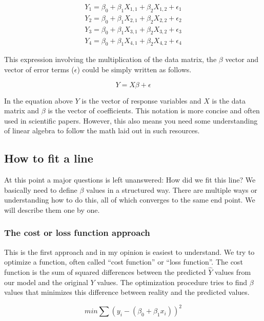 \documentclass[12pt,]{krantz}
\begin{document}
\[
\begin{aligned}
Y_1= \beta_0+\beta_1X_{1,1}+\beta_2X_{1,2} +\epsilon_1 \\
Y_2= \beta_0+\beta_1X_{2,1}+\beta_2X_{2,2} +\epsilon_2 \\
Y_3= \beta_0+\beta_1X_{3,1}+\beta_2X_{3,2} +\epsilon_3 \\
Y_4= \beta_0+\beta_1X_{4,1}+\beta_2X_{4,2} +\epsilon_4 
\end{aligned}
\]

This expression involving the multiplication of the data matrix, the
\(\beta\) vector and vector of error terms (\(\epsilon\))
could be simply written as follows.

\[Y=X\beta + \epsilon\]

In the equation above \(Y\) is the vector of response variables and \(X\) is the
data matrix and \(\beta\) is the vector of coefficients.
This notation is more concise and often used in scientific papers. However, this
also means you need some understanding of linear algebra to follow the math
laid out in such resources.

\hypertarget{how-to-fit-a-line}{%
\subsection{How to fit a line}\label{how-to-fit-a-line}}

At this point a major questions is left unanswered: How did we fit this line?
We basically need to define \(\beta\) values in a structured way.
There are multiple ways or understanding how
to do this, all of which converges to the same
end point. We will describe them one by one.

\hypertarget{the-cost-or-loss-function-approach}{%
\subsubsection{The cost or loss function approach}\label{the-cost-or-loss-function-approach}}

This is the first approach and in my opinion is easiest to understand.
We try to optimize a function, often called ``cost function'' or ``loss function''.
The cost function
is the sum of squared differences between the predicted \(\hat{Y}\) values from our model
and the original \(Y\) values. The optimization procedure tries to find \(\beta\) values
that minimizes this difference between reality and the predicted values.

\[min \sum{(y_i-(\beta_0+\beta_1x_i))^2}\]
\end{document}
